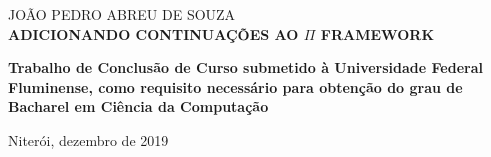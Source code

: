 
\begin{center}

    {\large JOÃO PEDRO ABREU DE SOUZA\\}
    \vspace{8cm}
    {\Large \textsc\textbf{{ADICIONANDO CONTINUAÇÕES AO $\Pi$ FRAMEWORK} }\\}
    \vspace{1cm}
    \hspace{.45\linewidth}
    \begin{minipage}{.50\linewidth}

            \textbf{Trabalho de Conclusão de Curso submetido à Universidade Federal Fluminense,  como requisito 
            necessário para obtenção do grau de Bacharel em Ciência da Computação }

           
    
    \end{minipage}

    \vspace{2cm}
    \vfill
    {\large Niterói, dezembro de 2019}
\end{center}

